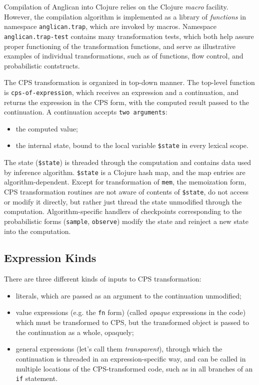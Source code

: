 \documentclass[preprint]{sigplanconf}
\begin{document}
Compilation of Anglican into Clojure relies on the Clojure
\textit{macro} facility. However, the compilation algorithm is
implemented as a library of \textit{functions} in namespace
\texttt{anglican.trap}, which are invoked by macros. Namespace
\texttt{anglican.trap-test} contains many transformation tests,
which both help assure proper functioning of the transformation
functions, and serve as illustrative examples of individual
transformations, such as of functions, flow control, and
probabilistic contstructs.

The CPS transformation is organized in top-down manner. The
top-level function is  \texttt{cps-of-expression}, which
receives an expression and a continuation, and returns the
expression in the CPS form, with the computed result passed to
the continuation. A continuation accepts \texttt{two arguments}:
\begin{itemize}
    \item the computed value;
    \item the internal state, bound to the local variable
        \texttt{\$state} in every lexical scope.
\end{itemize}
The state (\texttt{\$state}) is threaded through the computation
and contains data used by inference algorithm. \texttt{\$state}
is a Clojure hash map, and the map entries are
algorithm-dependent. Except for transformation of
\texttt{mem}, the memoization form, CPS transformation routines
are not aware of contents of \texttt{\$state}, do not access or
modify it directly, but rather just thread the state unmodified
through the computation. Algorithm-specific handlers of
checkpoints corresponding to the probabilistic forms
(\texttt{sample}, \texttt{observe}) modify the
state and reinject a new state into the computation.

\subsection{Expression Kinds}

There are three different kinds of inputs to CPS transformation:
\begin{itemize}
    \item literals, which are passed as an argument to the
        continuation unmodified;
    \item value expressions (e.g. the \texttt{fn} form) 
        (called \textit{opaque}
        expressions in the code) which must be transformed to
        CPS, but the transformed object is passed to the
        continuation as a whole, opaquely;
    \item general expressions (let's call them
        \textit{transparent}), through which the continuation is
        threaded in an expression-specific way, and can be
        called in multiple locations of the CPS-transformed
        code, such as in all branches of an \texttt{if}
        statement.
\end{itemize}
\end{document}
